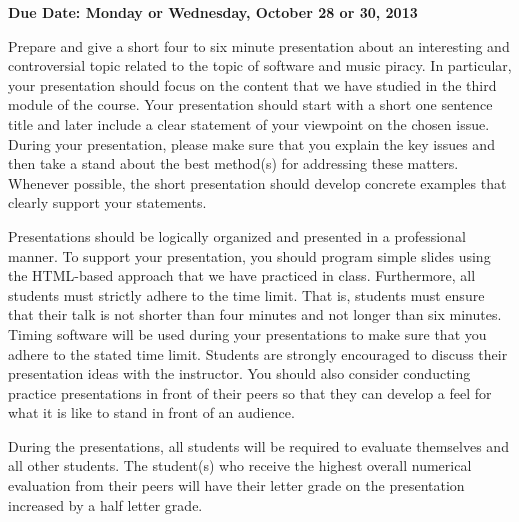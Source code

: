 

\usepackage[compact]{titlesec}



\vspace*{-.2in}
\begin{center}
	{\bf Due Date: Monday or Wednesday, October 28 or 30, 2013}
\end{center}

Prepare and give a short four to six minute presentation about an interesting and controversial topic related to the
topic of software and music piracy. In particular, your presentation should focus on the content that we have studied in
the third module of the course. Your presentation should start with a short one sentence title and later include a clear
statement of your viewpoint on the chosen issue. During your presentation, please make sure that you explain the key
issues and then take a stand about the best method(s) for addressing these matters. Whenever possible, the short
presentation should develop concrete examples that clearly support your statements.

Presentations should be logically organized and presented in a professional manner. To support your presentation, you
should program simple slides using the HTML-based approach that we have practiced in class. Furthermore, all
students must strictly adhere to the time limit. That is, students must ensure that their talk is not shorter than four
minutes and not longer than six minutes. Timing software will be used during your presentations to make sure that you
adhere to the stated time limit. Students are strongly encouraged to discuss their presentation ideas with the
instructor.  You should also consider conducting practice presentations in front of their peers so that they can develop
a feel for what it is like to stand in front of an audience.

During the presentations, all students will be required to evaluate themselves and all other students.  The student(s) who
receive the highest overall numerical evaluation from their peers will have their letter grade on the presentation
increased by a half letter grade.


